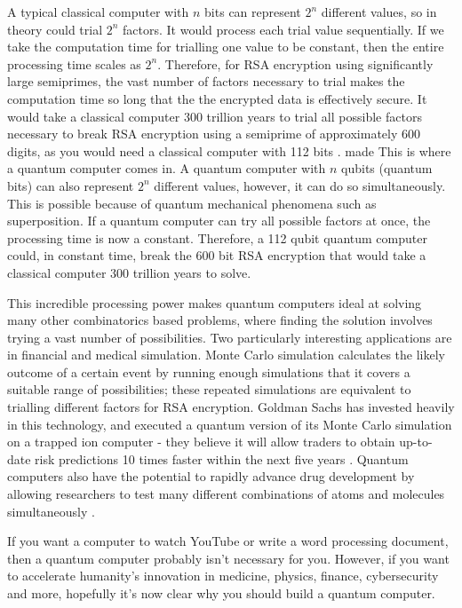 A typical classical computer with $n$ bits can represent $2^n$ different values, so in theory could trial $2^n$ factors. It would process each trial value sequentially. If we take the computation time for trialling one value to be constant, then the entire processing time scales as $2^n$. Therefore, for RSA encryption using significantly large semiprimes, the vast number of factors necessary to trial makes the computation time so long that the the encrypted data is effectively secure. It would take a classical computer 300 trillion years to trial all possible factors necessary to break RSA encryption using a semiprime of approximately 600 digits, as you would need a classical computer with 112 bits \cite{mahto2016security}\cite{quintessencelabs_2022}.
made 
This is where a quantum computer comes in. A quantum computer with $n$ qubits (quantum bits) can also represent $2^n$ different values, however, it can do so simultaneously. This is possible because of quantum mechanical phenomena such as superposition. If a quantum computer can try all possible factors at once, the processing time is now a constant. Therefore, a 112 qubit quantum computer could, in constant time, break the 600 bit RSA encryption that would take a classical computer 300 trillion years to solve.

This incredible processing power makes quantum computers ideal at solving many other combinatorics based problems, where finding the solution involves trying a vast number of possibilities. Two particularly interesting applications are in financial and medical simulation. Monte Carlo simulation calculates the likely outcome of a certain event by running enough simulations that it covers a suitable range of possibilities; these repeated simulations are equivalent to trialling different factors for RSA encryption. Goldman Sachs has invested heavily in this technology, and executed a quantum version of its Monte Carlo simulation on a trapped ion computer - they believe it will allow traders to obtain up-to-date risk predictions 10 times faster within the next five years \cite{Giurgica_Tiron_2022}. Quantum computers also have the potential to rapidly advance drug development by allowing researchers to test many different combinations of atoms and molecules simultaneously \cite{bova2021commercial}.

If you want a computer to watch YouTube or write a word processing document, then a quantum computer probably isn't necessary for you. However, if you want to accelerate humanity's innovation in medicine, physics, finance, cybersecurity and more, hopefully it's now clear why you should build a quantum computer.

